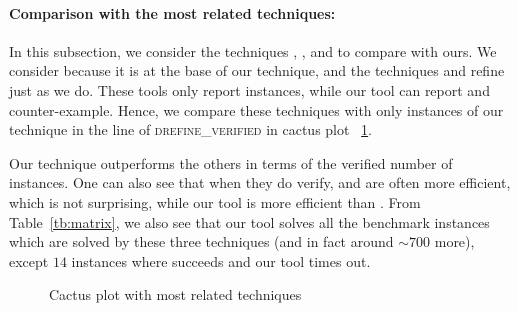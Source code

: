 \paragraph{Comparison with the most related techniques:}
In this subsection, we consider the techniques \deeppoly{}, \kpoly{}, and \deepsrgr{} to compare with ours. 
We consider \deeppoly{} because it is at the base of our technique, and the techniques \kpoly{} and \deepsrgr{} refine \deeppoly{} just as we do. These tools only report \verified{} instances, while our tool can report  \verified{} and counter-example. Hence, we compare these techniques with only \verified{}  instances of our technique in the line of \textsc{drefine\_verified} in cactus plot ~\ref{res:milp_with_milp}. 

Our technique outperforms the others in terms of the verified number of instances. One can also see that when they do verify, \deeppoly{} and \kpoly{} are often more efficient, which is not surprising, while our tool is more efficient than \deepsrgr{}. From Table~\ref{tb:matrix}, we also see  that our tool solves all the benchmark instances which are solved by these three techniques (and in fact around $\sim 700$ more), %
except $14$ instances where \kpoly{} succeeds and our tool times out.

\begin{figure}[t]
    
    \caption{Cactus plot with most related techniques}
    \label{res:milp_with_milp}
\end{figure}



